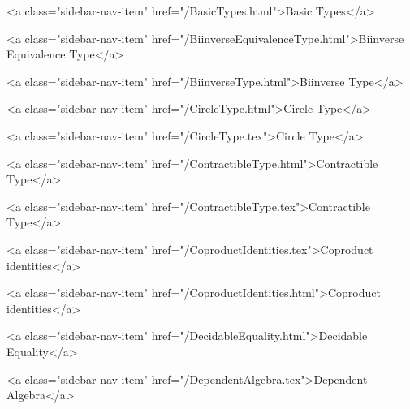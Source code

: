           <a class="sidebar-nav-item" href="/BasicTypes.html">Basic Types</a>
        
      
    
      
        
          <a class="sidebar-nav-item" href="/BiinverseEquivalenceType.html">Biinverse Equivalence Type</a>
        
      
    
      
        
          <a class="sidebar-nav-item" href="/BiinverseType.html">Biinverse Type</a>
        
      
    
      
        
          <a class="sidebar-nav-item" href="/CircleType.html">Circle Type</a>
        
      
    
      
        
          <a class="sidebar-nav-item" href="/CircleType.tex">Circle Type</a>
        
      
    
      
        
          <a class="sidebar-nav-item" href="/ContractibleType.html">Contractible Type</a>
        
      
    
      
        
          <a class="sidebar-nav-item" href="/ContractibleType.tex">Contractible Type</a>
        
      
    
      
        
          <a class="sidebar-nav-item" href="/CoproductIdentities.tex">Coproduct identities</a>
        
      
    
      
        
          <a class="sidebar-nav-item" href="/CoproductIdentities.html">Coproduct identities</a>
        
      
    
      
        
          <a class="sidebar-nav-item" href="/DecidableEquality.html">Decidable Equality</a>
        
      
    
      
        
          <a class="sidebar-nav-item" href="/DependentAlgebra.tex">Dependent Algebra</a>
        
      
    
